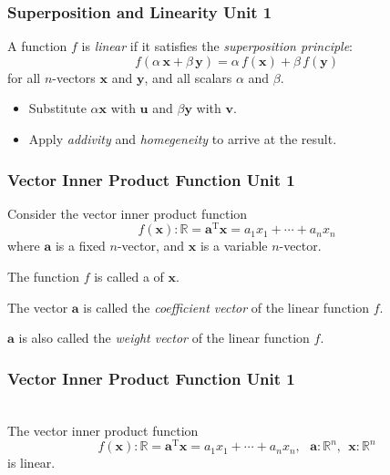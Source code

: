 \documentclass[12pt]{beamer}
\newcommand{\FrameTitle}[2]{\frametitle{#1 \hfill \small\textnormal{\textcolor{midgray}{#2}}}}
\newcommand{\ThreePtVspace}{\vspace*{3pt}}
\newcommand{\SixPtVspace}{\vspace*{6pt}}
\newcommand{\vsp}{\vspace*{1em}}
\newcommand{\Vector}[1]{\textbf{#1}}
\newcommand{\Quiz}[1]{{\Large\textbf{\color{question}{#1}}}}
\newcommand{\Sketch}[1]{{\Large\textbf{\color{codecoffee}{#1}}}}
\begin{document}
\begin{frame}\FrameTitle{Superposition and Linearity}{Unit 1}
    {\Quiz{Prove the following}}
    \vspace*{4pt}
    \begin{definition}
        \ThreePtVspace
        A function $f$ is \emph{linear} if it satisfies the \emph{superposition principle}:
        \[
            f(\alpha \, \Vector{x} + \beta \, \Vector{y}) = \alpha \, f(\Vector{x}) + \beta \,f(\Vector{y})
        \]
        for all $n$-vectors $\Vector{x}$ and $\Vector{y}$, and all scalars $\alpha$ and $\beta$.
    \end{definition}

    \vsp
    \Sketch{Hint}
    \vspace*{4pt}
    \begin{itemize}
        \item[--] Substitute $\alpha \Vector{x}$ with $\Vector{u}$ and $\beta \Vector{y}$ with $\Vector{v}$.
        \vspace*{4pt}
        \item[--] Apply \emph{addivity} and \emph{homegeneity} to arrive at the result.
    \end{itemize}
\end{frame}

\begin{frame}\FrameTitle{Vector Inner Product Function}{Unit 1}
    Consider the vector inner product function
    \[
        f(\Vector{x}):\mathbb{R} = \Vector{a}^{\textrm{T}} \Vector{x} = a_1x_1 + \cdots + a_nx_n
    \]
    where $\Vector{a}$ is a fixed $n$-vector, and $\Vector{x}$ is a variable $n$-vector.

    \SixPtVspace The function $f$ is called a {\emph{\color{yellow}{linear function}}} of $\Vector{x}$.

    \SixPtVspace The vector $\Vector{a}$ is called the \emph{coefficient vector} of the linear function $f$.

    \SixPtVspace $\Vector{a}$ is also called the \emph{weight vector} of the linear function $f$.
\end{frame}

\begin{frame}\FrameTitle{Vector Inner Product Function}{Unit 1}
    \vsp
    {\Quiz{Prove the following}}\vsp\\

    The vector inner product function
    \[
        f(\Vector{x}):\mathbb{R} = \Vector{a}^{\textrm{T}} \Vector{x} = a_1x_1 + \cdots + a_nx_n, \ \ \  \Vector{a}: \mathbb{R}^n, \ \ \Vector{x}: \mathbb{R}^n
    \]
    is linear.
\end{frame}
\end{document}
